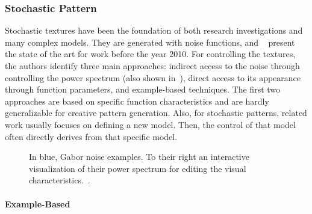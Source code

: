 \subsubsection{Stochastic Pattern}
\label{subsubsec:analysis_distribution_and_repetition_stochastic}

Stochastic textures have been the foundation of both research investigations and many complex models. They are generated with noise functions, and \citeauthor*{lagae_2010_sap}~\cite{lagae_2010_sap} present the state of the art for work before the year 2010.  For controlling the textures, the authors identify three main approaches: indirect access to the noise through controlling the power spectrum (also shown in~), direct access to its appearance through function parameters, and example-based techniques. The first two approaches are based on specific function characteristics and are hardly generalizable for creative pattern generation. Also, for stochastic patterns, related work usually focuses on defining a new model. Then, the control of that model often directly derives from that specific model.

\begin{figure}[H]
    \centering
    \caption{\label{fig:galerne_2012_gne}In blue, Gabor noise examples. To their right an interactive visualization of their power spectrum for editing the visual characteristics.~\cite{galerne_2012_gne}.}
\end{figure}

\paragraph*{Example-Based}
\label{para:analysis_stochastic_examplebased_control}

